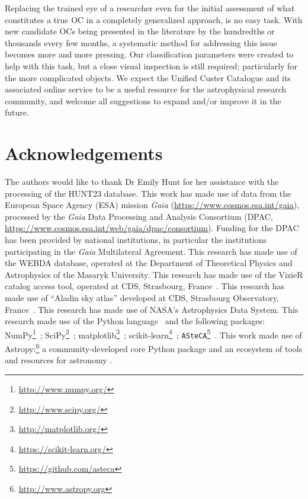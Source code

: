 \documentclass[fleqn,usenatbib]{mnras}
\begin{document}
Replacing the trained eye of a researcher even for the initial assessment
of what constitutes a true OC in a completely generalized approach, is no
easy task. With new candidate OCs being presented in the literature by the
hundredths or thousands every few months, a systematic method for addressing
this issue becomes more and more pressing.
Our classification parameters were created to help with this task, but a close
visual inspection is still required; particularly for the more complicated
objects.
We expect the Unified Custer Catalogue and its associated online service to be a
useful resource for the astrophysical research community, and welcome all
suggestions to expand and/or improve it in the future.



\section*{Acknowledgements}

The authors would like to thank Dr Emily Hunt for her assistance with the
processing of the HUNT23 database.
%
This work has made use of data from the European Space Agency (ESA) mission
{\it Gaia} (\url{https://www.cosmos.esa.int/gaia}), processed by the {\it Gaia}
Data Processing and Analysis Consortium (DPAC,
\url{https://www.cosmos.esa.int/web/gaia/dpac/consortium}). Funding for the DPAC
has been provided by national institutions, in particular the institutions
participating in the {\it Gaia} Multilateral Agreement.
%
This research has made use of the WEBDA database, operated at the Department of
Theoretical Physics and Astrophysics of the Masaryk University.
%
This research has made use of the VizieR catalog access tool, operated at CDS,
Strasbourg, France~\citep{Ochsenbein_2000}.
%
This research has made use of ``Aladin sky atlas'' developed at
CDS, Strasbourg Observatory, France~\citep{Bonnarel2000,Boch2014,Baumann_2022}.
%
This research has made use of NASA's Astrophysics Data System.
%
This research made use of the Python language~\citep{vanRossum_1995}
and the following packages:
NumPy\footnote{\url{http://www.numpy.org/}}~\citep{vanDerWalt_2011};
SciPy\footnote{\url{http://www.scipy.org/}}~\citep{Jones_2001};
matplotlib\footnote{\url{http://matplotlib.org/}}~\citep{hunter_2007};
scikit-learn\footnote{\url{https://scikit-learn.org/}}~\citep{scikit-learn};
\texttt{ASteCA}\footnote{\url{https://github.com/asteca}}~\citep{Perren_2015}.
%
This work made use of Astropy:\footnote{\url{http://www.astropy.org}} a
community-developed core Python package and an ecosystem of tools and resources
for astronomy \citep{astropy:2013, astropy:2018, astropy:2022}.
\end{document}
